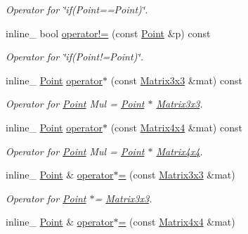 \begin{DoxyCompactItemize}
\begin{DoxyCompactList}\small\item\em Operator for \char`\"{}if(\+Point==\+Point)\char`\"{}. \end{DoxyCompactList}\item 
inline\+\_\+ bool \hyperlink{classPoint_a9c1847f9b24e2c7611339f0754f81613}{operator!=} (const \hyperlink{classPoint}{Point} \&p) const \hypertarget{classPoint_a9c1847f9b24e2c7611339f0754f81613}{}\label{classPoint_a9c1847f9b24e2c7611339f0754f81613}

\begin{DoxyCompactList}\small\item\em Operator for \char`\"{}if(\+Point!=\+Point)\char`\"{}. \end{DoxyCompactList}\item 
inline\+\_\+ \hyperlink{classPoint}{Point} \hyperlink{classPoint_a225cacd80325f76e67cf9e703df48497}{operator$\ast$} (const \hyperlink{classMatrix3x3}{Matrix3x3} \&mat) const \hypertarget{classPoint_a225cacd80325f76e67cf9e703df48497}{}\label{classPoint_a225cacd80325f76e67cf9e703df48497}

\begin{DoxyCompactList}\small\item\em Operator for \hyperlink{classPoint}{Point} Mul = \hyperlink{classPoint}{Point} $\ast$ \hyperlink{classMatrix3x3}{Matrix3x3}. \end{DoxyCompactList}\item 
inline\+\_\+ \hyperlink{classPoint}{Point} \hyperlink{classPoint_a80aff349c3b01be915ef69f4490e413d}{operator$\ast$} (const \hyperlink{classMatrix4x4}{Matrix4x4} \&mat) const \hypertarget{classPoint_a80aff349c3b01be915ef69f4490e413d}{}\label{classPoint_a80aff349c3b01be915ef69f4490e413d}

\begin{DoxyCompactList}\small\item\em Operator for \hyperlink{classPoint}{Point} Mul = \hyperlink{classPoint}{Point} $\ast$ \hyperlink{classMatrix4x4}{Matrix4x4}. \end{DoxyCompactList}\item 
inline\+\_\+ \hyperlink{classPoint}{Point} \& \hyperlink{classPoint_adb2d0770621b5205b431ffaf50452971}{operator$\ast$=} (const \hyperlink{classMatrix3x3}{Matrix3x3} \&mat)\hypertarget{classPoint_adb2d0770621b5205b431ffaf50452971}{}\label{classPoint_adb2d0770621b5205b431ffaf50452971}

\begin{DoxyCompactList}\small\item\em Operator for \hyperlink{classPoint}{Point} $\ast$= \hyperlink{classMatrix3x3}{Matrix3x3}. \end{DoxyCompactList}\item 
inline\+\_\+ \hyperlink{classPoint}{Point} \& \hyperlink{classPoint_a4214787c11b9c9c93f0e3ae07f15dec9}{operator$\ast$=} (const \hyperlink{classMatrix4x4}{Matrix4x4} \&mat)\hypertarget{classPoint_a4214787c11b9c9c93f0e3ae07f15dec9}{}\label{classPoint_a4214787c11b9c9c93f0e3ae07f15dec9}


\end{DoxyCompactItemize}
